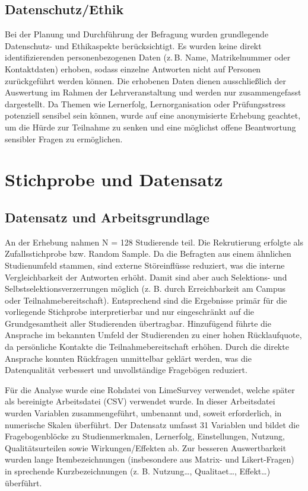 \documentclass[a4paper,12pt]{article}
\begin{document}
\subsection{Datenschutz/Ethik}

Bei der Planung und Durchführung der Befragung wurden grundlegende Datenschutz- und Ethikaspekte berücksichtigt. Es wurden keine direkt identifizierenden personenbezogenen Daten (z.\,B. Name, Matrikelnummer oder Kontaktdaten) erhoben, sodass einzelne Antworten nicht auf Personen zurückgeführt werden können. Die erhobenen Daten dienen ausschließlich der Auswertung im Rahmen der Lehrveranstaltung und werden nur zusammengefasst dargestellt. Da Themen wie Lernerfolg, Lernorganisation oder Prüfungsstress potenziell sensibel sein können, wurde auf eine anonymisierte Erhebung geachtet, um die Hürde zur Teilnahme zu senken und eine möglichst offene Beantwortung sensibler Fragen zu ermöglichen.




\section{Stichprobe und Datensatz}

\subsection{Datensatz und Arbeitsgrundlage}

An der Erhebung nahmen N = 128 Studierende teil. Die Rekrutierung erfolgte als Zufallsstichprobe bzw. Random Sample. Da die Befragten aus einem ähnlichen Studienumfeld stammen, sind externe Störeinflüsse reduziert, was die interne Vergleichbarkeit der Antworten erhöht.
Damit sind aber auch Selektions- und Selbstselektionsverzerrungen möglich (z. B. durch Erreichbarkeit am Campus oder Teilnahmebereitschaft). Entsprechend sind die Ergebnisse primär für die vorliegende Stichprobe interpretierbar und nur eingeschränkt auf die Grundgesamtheit aller Studierenden übertragbar.
Hinzufügend führte die Ansprache im bekannten Umfeld der Studierenden zu einer hohen Rücklaufquote, da persönliche Kontakte die Teilnahmebereitschaft erhöhen. Durch die direkte Ansprache konnten Rückfragen unmittelbar geklärt werden, was die Datenqualität verbessert und unvollständige Fragebögen reduziert.

Für die Analyse wurde eine Rohdatei von LimeSurvey verwendet, welche später als bereinigte Arbeitsdatei (CSV) verwendet wurde. In dieser Arbeitsdatei wurden Variablen zusammengeführt, umbenannt und, soweit erforderlich, in numerische Skalen überführt. Der Datensatz umfasst 31 Variablen und bildet die Fragebogenblöcke zu Studienmerkmalen, Lernerfolg, Einstellungen, Nutzung, Qualitätsurteilen sowie Wirkungen/Effekten ab. Zur besseren Auswertbarkeit wurden lange Itembezeichnungen (insbesondere aus Matrix- und Likert-Fragen) in sprechende Kurzbezeichnungen (z. B. Nutzung…, Qualitaet…, Effekt…) überführt.
\end{document}
